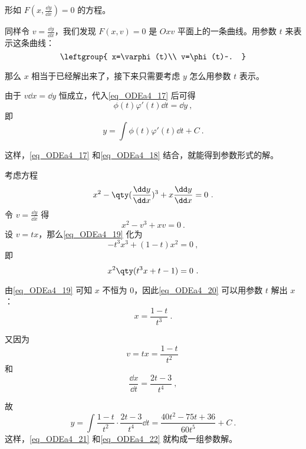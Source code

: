 形如 $F(x, \frac{\dd y}{\dd x})=0$ 的方程。

同样令 $v=\frac{\dd y}{\dd x}$，我们发现 $F(x, v)=0$ 是 $Oxv$ 平面上的一条曲线。用参数 $t$ 来表示这条曲线：
\begin{equation}\label{eq_ODEa4_17}
\leftgroup{
    x=\varphi(t)\\
    v=\phi(t)~.
}
\end{equation}

那么 $x$ 相当于已经解出来了，接下来只需要考虑 $y$ 怎么用参数 $t$ 表示。

由于 $v\dd x=\dd y$ 恒成立，代入\autoref{eq_ODEa4_17} 后可得
\begin{equation}
\phi(t)\varphi'(t)\dd t=\dd y~,
\end{equation}
即
\begin{equation}\label{eq_ODEa4_18}
y=\int \phi(t)\varphi'(t)\dd t+C~.
\end{equation}

这样，\autoref{eq_ODEa4_17} 和\autoref{eq_ODEa4_18} 结合，就能得到参数形式的解。

\begin{example}{}
考虑方程
\begin{equation}
x^2-\qty(\frac{\dd y}{\dd x})^3+x\frac{\dd y}{\dd x}=0~.
\end{equation}
令 $v=\frac{\dd y}{\dd x}$ 得
\begin{equation}\label{eq_ODEa4_19}
x^2-v^3+xv=0~.
\end{equation}
设 $v=tx$，那么\autoref{eq_ODEa4_19} 化为
\begin{equation}
-t^3x^3+(1-t)x^2=0~,
\end{equation}
即
\begin{equation}\label{eq_ODEa4_20}
x^2\qty(t^3x+t-1)=0~.
\end{equation}

由\autoref{eq_ODEa4_19} 可知 $x$ 不恒为 $0$，因此\autoref{eq_ODEa4_20} 可以用参数 $t$ 解出 $x$：
\begin{equation}\label{eq_ODEa4_21}
x=\frac{1-t}{t^3}~.
\end{equation}

又因为
\begin{equation}
v=tx=\frac{1-t}{t^2}~
\end{equation}
和
\begin{equation}
\frac{\dd x}{\dd t}=\frac{2t-3}{t^4}~,
\end{equation}

故
\begin{equation}\label{eq_ODEa4_22}
y=\int \frac{1-t}{t^2}\cdot\frac{2t-3}{t^4}\dd t=\frac{40t^2-75t+36}{60t^5}+C~.
\end{equation}
这样，\autoref{eq_ODEa4_21} 和\autoref{eq_ODEa4_22} 就构成一组参数解。



\end{example}



